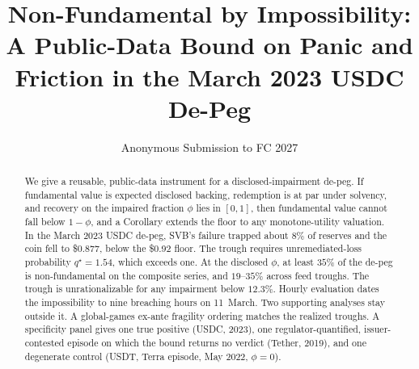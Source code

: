 \documentclass[runningheads]{llncs}
\begin{document}
\title{Non-Fundamental by Impossibility: A Public-Data Bound on Panic and Friction in the March 2023 USDC De-Peg}
\author{Anonymous Submission to FC 2027}
\institute{}

\maketitle

\begin{abstract}
We give a reusable, public-data instrument for a disclosed-impairment de-peg.
If fundamental value is expected disclosed backing, redemption is at par under solvency,
and recovery on the impaired fraction $\phi$ lies in $[0,1]$,
then fundamental value cannot fall below $1-\phi$, and a Corollary extends the floor to
any monotone-utility valuation. In the March 2023 USDC de-peg, SVB's failure trapped
about $8\%$ of reserves and the coin fell to \$0.877, below the \$0.92 floor.
The trough requires unremediated-loss probability $q^{\star}=1.54$, which
exceeds one. At the disclosed $\phi$, at least $35\%$ of the de-peg is non-fundamental on
the composite series, and $19$--$35\%$ across feed troughs. The trough is unrationalizable
for any impairment below $12.3\%$. Hourly evaluation dates the impossibility to nine
breaching hours on
11~March. Two supporting analyses stay outside it. A global-games ex-ante fragility
ordering matches the realized troughs. A specificity panel gives one true positive (USDC,
2023), one regulator-quantified, issuer-contested episode on which the bound returns no
verdict (Tether, 2019), and one degenerate
control (USDT, Terra episode, May 2022, $\phi=0$).

\end{abstract}
\end{document}
